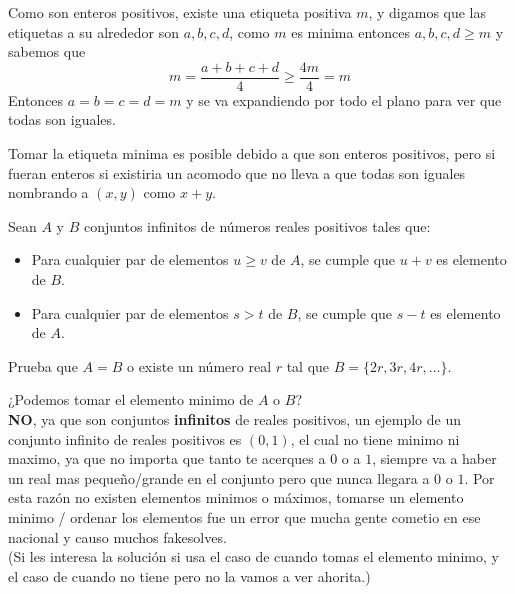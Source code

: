 \documentclass[11pt]{scrartcl}
\begin{document}
\begin{soln}
Como son enteros positivos, existe una etiqueta positiva $m$, y digamos que las etiquetas a su alrededor son $a,b,c,d$, como $m$ es minima entonces $a,b,c,d \geq m$ y sabemos que 
\[m=\frac{a+b+c+d}{4} \geq \frac{4m}{4}=m\]
Entonces $a=b=c=d=m$ y se va expandiendo por todo el plano para ver que todas son iguales.
\end{soln}
\begin{remark*}
Tomar la etiqueta minima es posible debido a que son enteros positivos, pero si fueran enteros si existiria un acomodo que no lleva a que todas son iguales nombrando a $(x,y)$ como $x+y$.  
\end{remark*}

\begin{example} [OMM 2024/5]
    Sean $A$ y $B$ conjuntos infinitos de números reales positivos tales que:
    \begin{itemize}
        \item Para cualquier par de elementos $u \geq v$ de $A$, se cumple que $u+v$ es elemento de $B$.
        \item Para cualquier par de elementos $s > t$ de $B$, se cumple que $s-t$ es elemento de $A$.
    \end{itemize}
    Prueba que $A=B$ o existe un número real $r$ tal que $B=\{2r,3r,4r,\ldots\}$.
\end{example}
\begin{soln}
¿Podemos tomar el elemento minimo de $A$ o $B$?\\
\textbf{NO}, ya que son conjuntos \textbf{infinitos} de reales positivos, un ejemplo de un conjunto infinito de reales positivos es $(0,1)$, el cual no tiene minimo ni maximo, ya que no importa que tanto te acerques a $0$ o a $1$, siempre va a haber un real mas pequeño/grande en el conjunto pero que nunca 
llegara a $0$ o $1$. Por esta razón no existen elementos minimos o máximos, tomarse un elemento minimo / ordenar los elementos fue un error que mucha gente cometio en ese nacional y causo muchos fakesolves.  \\
(Si les interesa la solución si usa el caso de cuando tomas el elemento minimo, y el caso de cuando no tiene pero no la vamos a ver ahorita.)
\end{soln}
\end{document}

